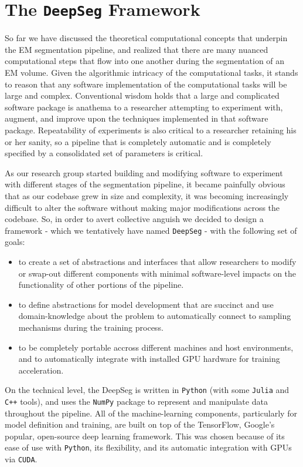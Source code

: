 \chapter{The \texttt{DeepSeg} Framework}
So far we have discussed the theoretical computational concepts that underpin the EM segmentation pipeline, and realized that there are many nuanced computational steps that flow into one another during the segmentation of an EM volume. Given the algorithmic intricacy of the computational tasks, it stands to reason that any software implementation of the computational tasks will be large and complex. Conventional wisdom holds that a large and complicated software package is anathema to a researcher attempting to experiment with, augment, and improve upon the techniques implemented in that software package. Repeatability of experiments is also critical to a researcher retaining his or her sanity, so a pipeline that is completely automatic and is completely specified by a consolidated set of parameters is critical.

As our research group started building and modifying software to experiment with different stages of the segmentation pipeline, it became painfully obvious that as our codebase grew in size and complexity, it was becoming increasingly difficult to alter the software without making major modifications across the codebase. So, in order to avert collective anguish we decided to design a framework - which we tentatively have named \texttt{DeepSeg} - with the following set of goals:

\begin{itemize}
	\item to create a set of abstractions and interfaces that allow researchers to modify or swap-out different components with minimal software-level impacts on the functionality of other portions of the pipeline.
	\item to define abstractions for model development that are succinct and use domain-knowledge about the problem to automatically connect to sampling mechanisms during the training process. 
	\item to be completely portable accross different machines and host environments, and to automatically integrate with installed GPU hardware for training acceleration.
\end{itemize}

On the technical level, the DeepSeg is written in \texttt{Python} (with some \texttt{Julia} and \texttt{C++} tools), and uses the \texttt{NumPy} package to represent and manipulate data throughout the pipeline. All of the machine-learning components, particularly for model definition and training, are built on top of the TensorFlow, Google's popular, open-source deep learning framework\cite{Abadi}. This was chosen because of its ease of use with \texttt{Python}, its flexibility, and its automatic integration with GPUs via \texttt{CUDA}.

